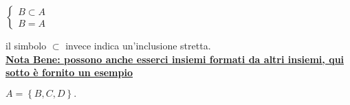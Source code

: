 \documentclass[a4paper]{article}
\begin{document}
\begin{center}
	\begin{math}
		\left\lbrace 
		\begin{array}{l}
			B \subset A\\
			B = A
		\end{array}
	\right.
	\end{math}
\end{center}
il simbolo $\subset$ invece indica un'inclusione stretta.\\
\underline{\textbf{Nota Bene: possono anche esserci insiemi formati da altri insiemi, qui sotto è fornito un esempio}}
\begin{center}
	\begin{math}
		A=\left\lbrace B,C,D\right\rbrace .
	\end{math}
\end{center}
\end{document}
